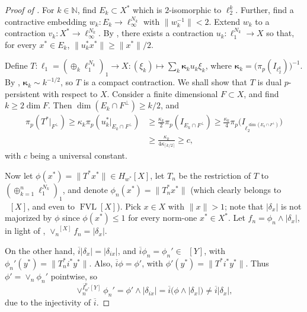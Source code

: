 \documentclass{amsart}
\theoremstyle{plain}
\theoremstyle{definition}
\numberwithin{equation}{section}
\newcommand{\N}{\mathbb{N}}
\DeclareMathOperator{\FVL}{FVL}
\DeclareMathOperator{\FBLp}{FBL^{\mathit{(p)}}}
\newcommand{\Ip}{\overline{I}_{w^*}^{p}}
\begin{document}
\begin{proof}[Proof of ]
For $k \in \N$, find $E_k \subset X^*$ which is $2$-isomorphic to $\ell_2^k$.
Further, find a contractive embedding $w_k : E_k \to \ell_\infty^{N_k}$ with $\|w_k^{-1}\| < 2$. Extend $w_k$ to a contraction $v_k : X^* \to \ell_\infty^{N_k}$.
By \cite{OjP}, there exists a contraction $u_k : \ell_1^{N_k} \to X$ so that, for every $x^* \in E_k$, $\|u_k^* x^*\| \geq \|x^*\|/2$.

Define $T : \ell_1 = (\oplus_k \ell_1^{N_k})_1 \to X : (\xi_k) \mapsto \sum_k {\boldsymbol{\kappa}}_k u_k \xi_k$, where ${\boldsymbol{\kappa}}_k = \big (\pi_p(I_{\ell_2^k})\big )^{-1}$. By \cite[Corollary 4.13]{DJT}, ${\boldsymbol{\kappa}}_k \sim k^{-1/2}$, so $T$ is a compact contraction.
We shall show that $T$ is dual $p$-persistent with respect to $X$. Consider a finite dimensional $F \subset X$, and find $k \geq 2 \dim F$. Then $\dim (E_k \cap F^\perp) \geq k/2$, and 
\begin{align*}
\pi_p(T^*|_{F^\perp}) \geq \kappa_k \pi_p(u_k^*|_{E_k \cap F^\perp}) 
&
\geq \frac{\kappa_k}2 \pi_p(I_{E_k \cap F^\perp}) \geq \frac{\kappa_k}4 \pi_p\big(I_{\ell_2^{\dim (E_k \cap F^\perp)}}\big) 
\\ &
\geq \frac{\kappa_k}{4 \kappa_{\lceil k/2 \rceil}} \geq c , 
\end{align*}
with $c$ being a universal constant.

Now let $\phi(x^*) = \|T^* x^*\| \in H_{w^*}[X]$, let $T_n$ be the restriction of $T$ to $(\oplus_{k=1}^n \ell_1^{N_k})_1$, and denote $\phi_n(x^*) = \|T_n^* x^*\|$ (which clearly belongs to $\FBLp[X]$, and even to $\FVL[X]$). Pick $x \in X$ with $\|x\| > 1$; note that $\big| \delta_x \big|$ is not majorized by $\phi$ since $\phi(x^*) \leq 1$ for every norm-one $x^* \in X^*$. 
Let $f_n = \phi_n \wedge \big| \delta_x \big|$, in light of , $\vee_n^{\FBLp[X]} f_n = \big| \delta_x \big|$. 

On the other hand, $\overline{i} \big| \delta_x \big| = \big| \delta_{ix} \big|$, and $\overline{i} \phi_n = \phi_n' \in \FBLp[Y]$, with $\phi_n'(y^*) = \|T_n^* i^* y^*\|$. Also, $\overline{i} \phi = \phi'$, with $\phi'(y^*) = \|T^* i^* y^*\|$. Thus $\phi' = \vee_n \phi_n'$ pointwise, so 
$$
\vee_n^{\Ip[Y]} \phi_n' = \phi' \wedge \big|\delta_{ix}\big| = \overline{i} \big( \phi \wedge \big|\delta_x\big| \big) \neq \overline{i} \big|\delta_x\big| , %
$$
due to the injectivity of $\overline{i}$.
\end{proof}
\end{document}
